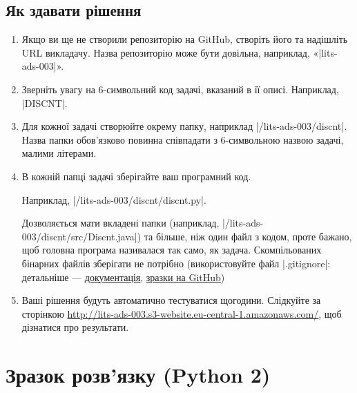 \documentclass[12pt,a4paper]{article}
\begin{document}
\subsection*{Як здавати рішення}

\begin{enumerate}
    \item Якщо ви ще не створили репозиторію на GitHub, створіть його та надішліть URL викладачу. Назва репозиторію може бути довільна, наприклад, «|lits-ads-003|».
    \item Зверніть увагу на 6-символьний код задачі, вказаний в її описі. Наприклад, |DISCNT|.
    \item Для кожної задачі створюйте окрему папку, наприклад |/lits-ads-003/discnt|. Назва папки обов’язково повинна співпадати з 6-символьною назвою задачі, малими літерами.
    \item В кожній папці задачі зберігайте ваш програмний код.

    Наприклад, |/lits-ads-003/discnt/discnt.py|.

    Дозволяється мати вкладені папки (наприклад, |/lits-ads-003/discnt/src/Discnt.java|) та більше, ніж один файл з кодом, проте бажано, щоб головна програма називалася так само, як задача. Скомпільованих бінарних файлів зберігати не потрібно (використовуйте файл |.gitignore|: детальніше --- \href{http://git-scm.com/docs/gitignore}{документація}, \href{https://github.com/github/gitignore}{зразки на GitHub})

    \item Ваші рішення будуть автоматично тестуватися щогодини. Слідкуйте за сторінкою \href{http://lits-ads-003.s3-website.eu-central-1.amazonaws.com/}{http://lits-ads-003.s3-website.eu-central-1.amazonaws.com/}, щоб дізнатися про результати.
\end{enumerate}


\pagebreak





\pagebreak


\section*{Зразок розв’язку (Python 2)}



\end{document}
